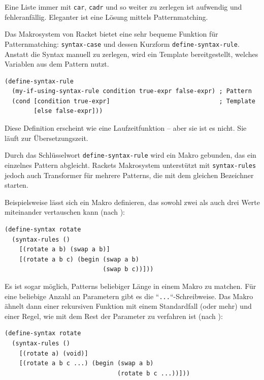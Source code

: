 Eine Liste immer mit \texttt{car}, \texttt{cadr} und so weiter zu zerlegen ist aufwendig und fehleranfällig. Eleganter ist eine Lösung mittels Patternmatching. %


Das Makrosystem von Racket bietet eine sehr bequeme Funktion für Patternmatching: \texttt{syntax-case} und dessen Kurzform \texttt{define-syntax-rule}. Anstatt die Syntax manuell zu zerlegen, wird ein Template bereitgestellt, welches Variablen aus dem Pattern nutzt.

\begin{lstlisting}
(define-syntax-rule 
  (my-if-using-syntax-rule condition true-expr false-expr) ; Pattern
  (cond [condition true-expr]                              ; Template
        [else false-expr]))
\end{lstlisting}

Diese Definition erscheint wie eine Laufzeitfunktion -- aber sie ist es nicht. Sie läuft zur Übersetzungszeit. 


Durch das Schlüsselwort \texttt{define-syntax-rule} wird ein Makro gebunden, das ein einzelnes Pattern abgleicht. Rackets Makrosystem unterstützt mit \texttt{syntax-rules} jedoch auch Transformer für mehrere Patterns, die mit dem gleichen Bezeichner starten.

Beispielsweise lässt sich ein Makro definieren, das sowohl zwei als auch drei Werte miteinander vertauschen kann (nach \cite{racketguide-macros}):

\begin{lstlisting}
(define-syntax rotate
  (syntax-rules ()
    [(rotate a b) (swap a b)]
    [(rotate a b c) (begin (swap a b)
                           (swap b c))]))
\end{lstlisting}

Es ist sogar möglich, Patterns beliebiger Länge in einem Makro zu matchen. Für eine beliebige Anzahl an Parametern gibt es die ``\texttt{...}``-Schreibweise. Das Makro ähnelt dann einer rekursiven Funktion mit einem Standardfall (oder mehr) und einer Regel, wie mit dem Rest der Parameter zu verfahren ist (nach \cite{racketguide-macros}):

\begin{lstlisting}
(define-syntax rotate
  (syntax-rules ()
    [(rotate a) (void)]
    [(rotate a b c ...) (begin (swap a b)
                               (rotate b c ...))]))
\end{lstlisting}


